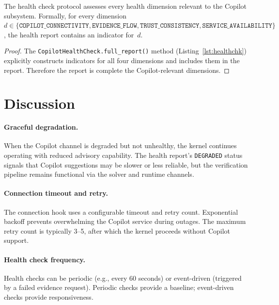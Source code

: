 \documentclass[11pt]{article}
\begin{document}
\begin{theorem}\label{thm:diagcomp}
The health check protocol assesses every health dimension
relevant to the Copilot subsystem.  Formally, for every
dimension $d \in \{\texttt{COPILOT\_CONNECTIVITY},
\texttt{EVIDENCE\_FLOW}, \texttt{TRUST\_CONSISTENCY},
\texttt{SERVICE\_AVAILABILITY}\}$, the health report
contains an indicator for~$d$.
\end{theorem}
\begin{proof}
The \texttt{CopilotHealthCheck.full\_report()} method
(Listing~\ref{lst:healthchk}) explicitly constructs
indicators for all four dimensions and includes them
in the report.  Therefore the report is complete \wrt{}
the Copilot-relevant dimensions.
\end{proof}

\section{Discussion}\label{sec:discussion}

\paragraph{Graceful degradation.}
When the Copilot channel is degraded but not unhealthy,
the kernel continues operating with reduced advisory
capability.  The health report's \texttt{DEGRADED} status
signals that Copilot suggestions may be slower or less
reliable, but the verification pipeline remains functional
via the solver and runtime channels.

\paragraph{Connection timeout and retry.}
The connection hook uses a configurable timeout and retry
count.  Exponential backoff prevents overwhelming the
Copilot service during outages.  The maximum retry count
is typically 3--5, after which the kernel proceeds without
Copilot support.

\paragraph{Health check frequency.}
Health checks can be periodic (e.g., every 60 seconds) or
event-driven (triggered by a failed evidence request).
Periodic checks provide a baseline; event-driven checks
provide responsiveness.
\end{document}
